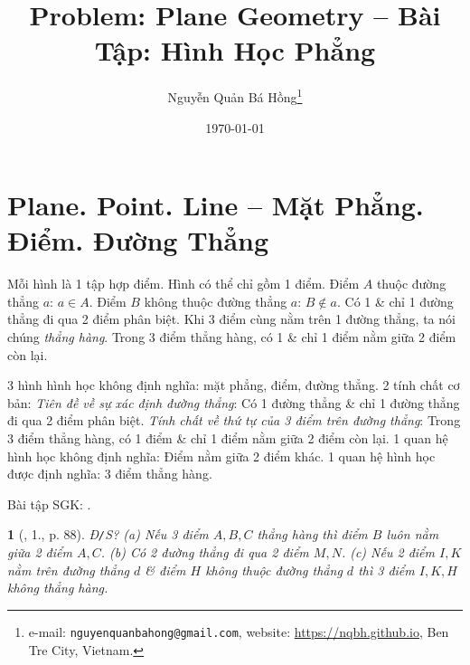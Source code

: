 \documentclass{article}
\title{Problem: Plane Geometry -- Bài Tập: Hình Học Phẳng}
\author{Nguyễn Quản Bá Hồng\footnote{e-mail: \texttt{nguyenquanbahong@gmail.com}, website: \url{https://nqbh.github.io}, Ben Tre City, Vietnam.}}
\date{\today}
\newtheorem{baitoan}{}
\begin{document}
\maketitle
\tableofcontents



\section{Plane. Point. Line -- Mặt Phẳng. Điểm. Đường Thẳng}
Mỗi hình là 1 tập hợp điểm. Hình có thể chỉ gồm 1 điểm. Điểm $A$ thuộc đường thẳng $a$: $a\in A$. Điểm $B$ không thuộc đường thẳng $a$: $B\notin a$. Có 1 \& chỉ 1 đường thẳng đi qua 2 điểm phân biệt. Khi 3 điểm cùng nằm trên 1 đường thẳng, ta nói chúng \textit{thẳng hàng}. Trong 3 điểm thẳng hàng, có 1 \& chỉ 1 điểm nằm giữa 2 điểm còn lại.

 3 hình hình học không định nghĩa: mặt phẳng, điểm, đường thẳng.  2 tính chất cơ bản: \textit{Tiên đề về sự xác định đường thẳng}: Có 1 đường thẳng \& chỉ 1 đường thẳng đi qua 2 điểm phân biệt. \textit{Tính chất về thứ tự của 3 điểm trên đường thẳng}: Trong 3 điểm thẳng hàng, có 1 điểm \& chỉ 1 điểm nằm giữa 2 điểm còn lại.  1 quan hệ hình học không định nghĩa: Điểm nằm giữa 2 điểm khác.  1 quan hệ hình học được định nghĩa: 3 điểm thẳng hàng.

\begin{center}
\end{center}
Bài tập SGK: \cite[1.--7., p. 79]{SGK_Toan_6_Canh_Dieu_tap_1}.

\begin{baitoan}[\cite{SBT_Toan_6_Canh_Dieu_tap_2}, 1., p. 88]
	\emph{Đ\texttt{/}S}? (a) Nếu 3 điểm $A,B,C$ thẳng hàng thì điểm $B$ luôn nằm giữa 2 điểm $A,C$. (b) Có 2 đường thẳng đi qua 2 điểm $M,N$. (c) Nếu 2 điểm $I,K$ nằm trên đường thẳng $d$ \& điểm $H$ không thuộc đường thẳng $d$ thì 3 điểm $I,K,H$ không thẳng hàng.
\end{baitoan}
\end{document}
